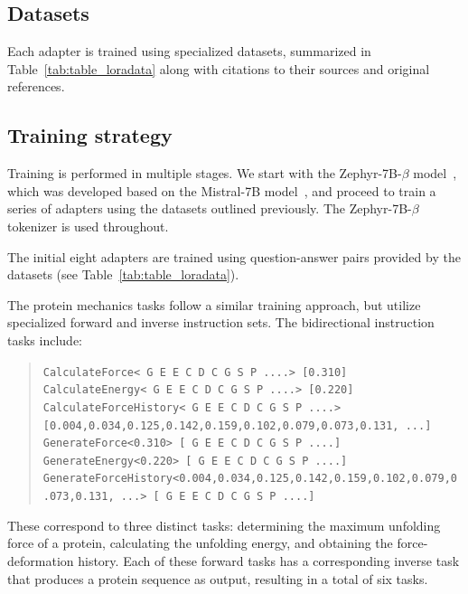 \subsection{Datasets}

Each adapter is trained using specialized datasets, summarized in Table~\ref{tab:table_loradata} along with citations to their sources and original references.

\subsection{Training strategy} Training is performed in multiple stages. We start with the Zephyr-7B-$\beta$ model~\cite{HuggingFaceH4/zephyr-7b-betaFace}, which was developed based on the Mistral-7B model~\cite{Jiang2023Mistral7B}, and proceed to train a series of adapters using the datasets outlined previously. The Zephyr-7B-$\beta$ tokenizer is used throughout.

The initial eight adapters are trained using question-answer pairs provided by the datasets (see Table~\ref{tab:table_loradata}).

The protein mechanics tasks follow a similar training approach, but utilize specialized forward and inverse instruction sets. The bidirectional instruction tasks include:

\begin{quote}
\tiny {\texttt{CalculateForce< G E E C D C G S P ....> [0.310]\\
CalculateEnergy< G E E C D C G S P ....> [0.220]\\ 
CalculateForceHistory< G E E C D C G S P ....> [0.004,0.034,0.125,0.142,0.159,0.102,0.079,0.073,0.131, ...]\\
GenerateForce<0.310>\,[ G E E C D C G S P ....]\\
GenerateEnergy<0.220>\,[ G E E C D C G S P ....]\\
GenerateForceHistory<0.004,0.034,0.125,0.142,0.159,0.102,0.079,0.073,0.131, ...>\,[ G E E C D C G S P ....] }}
\end{quote}

These correspond to three distinct tasks: determining the maximum unfolding force of a protein, calculating the unfolding energy, and obtaining the force-deformation history. Each of these forward tasks has a corresponding inverse task that produces a protein sequence as output, resulting in a total of six tasks.

